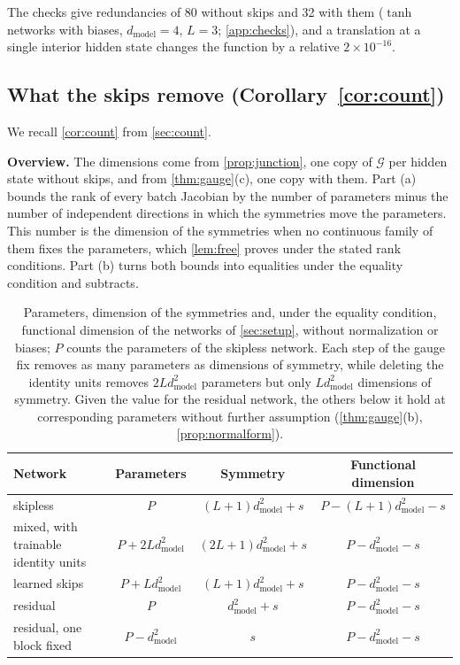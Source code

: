 \documentclass[10pt]{article}
\theoremstyle{definition}
\theoremstyle{remark}
\newcommand{\dm}{d_{\mathrm{model}}}
\newcommand{\G}{\mathcal{G}}
\newcommand{\para}[1]{\smallskip\noindent\textbf{#1}\hspace{0.5em}}
\begin{document}
The checks give redundancies of 80 without skips and 32 with them ($\tanh$ networks with biases, $\dm = 4$, $L = 3$; \cref{app:checks}), and a translation at a single interior hidden state changes the function by a relative $2\times10^{-16}$.

\subsection{What the skips remove\texorpdfstring{ (Corollary~\ref*{cor:count})}{}}\label{app:prf-count}

We recall \cref{cor:count} from \cref{sec:count}.
\corCount*

\para{Overview.} The dimensions come from \cref{prop:junction}, one copy of $\G$ per hidden state without skips, and from \cref{thm:gauge}(c), one copy with them. Part (a) bounds the rank of every batch Jacobian by the number of parameters minus the number of independent directions in which the symmetries move the parameters. This number is the dimension of the symmetries when no continuous family of them fixes the parameters, which \cref{lem:free} proves under the stated rank conditions. Part (b) turns both bounds into equalities under the equality condition and subtracts.

\begin{table}[ht]
\centering\small
\caption{Parameters, dimension of the symmetries and, under the equality condition, functional dimension of the networks of \cref{sec:setup}, without normalization or biases; $P$ counts the parameters of the skipless network. Each step of the gauge fix removes as many parameters as dimensions of symmetry, while deleting the identity units removes $2L\dm^2$ parameters but only $L\dm^2$ dimensions of symmetry. Given the value for the residual network, the others below it hold at corresponding parameters without further assumption (\cref{thm:gauge}(b), \cref{prop:normalform}).}
\label{tab:ledger}
\begin{tabular}{lccc}
\toprule
Network & Parameters & Symmetry & Functional dimension \\
\midrule
skipless & $P$ & $(L+1)\dm^2 + s$ & $P - (L+1)\dm^2 - s$ \\
mixed, with trainable identity units & $P + 2L\dm^2$ & $(2L+1)\dm^2 + s$ & $P - \dm^2 - s$ \\
learned skips & $P + L\dm^2$ & $(L+1)\dm^2 + s$ & $P - \dm^2 - s$ \\
residual & $P$ & $\dm^2 + s$ & $P - \dm^2 - s$ \\
residual, one block fixed & $P - \dm^2$ & $s$ & $P - \dm^2 - s$ \\
\bottomrule
\end{tabular}
\end{table}
\end{document}
